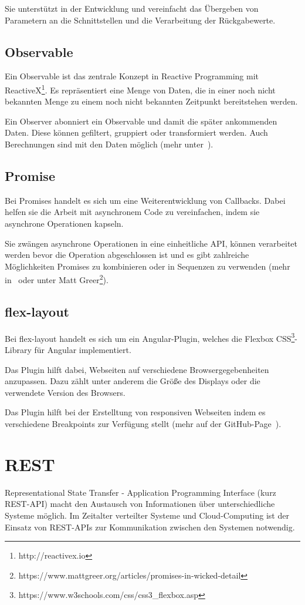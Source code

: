 Sie unterstützt in der Entwicklung und vereinfacht das Übergeben von Parametern an die Schnittstellen und die
Verarbeitung der Rückgabewerte.

\subsection{Observable}
Ein Observable ist das zentrale Konzept in Reactive Programming mit ReactiveX\footnote{http://reactivex.io}. Es
repräsentiert eine Menge von Daten, die in einer noch nicht bekannten Menge zu einem noch nicht bekannten Zeitpunkt
bereitstehen werden.

Ein Observer abonniert ein Observable und damit die später ankommenden Daten. Diese können gefiltert, gruppiert oder
transformiert werden. Auch Berechnungen sind mit den Daten möglich (mehr unter~\cite{book_grundlagen_observable}).

\subsection{Promise}
Bei Promises handelt es sich um eine Weiterentwicklung von Callbacks. Dabei helfen sie die Arbeit mit asynchronem Code
zu vereinfachen, indem sie asynchrone Operationen kapseln.

Sie zwängen asynchrone Operationen in eine einheitliche API, können verarbeitet werden bevor die Operation abgeschlossen
ist und es gibt zahlreiche Möglichkeiten Promises zu kombinieren oder in Sequenzen zu verwenden (mehr
in~\cite{book_grundlagen_promises} oder unter Matt Greer\footnote{https://www.mattgreer.org/articles/promises-in-wicked-detail}).

\subsection{flex-layout}
Bei flex-layout handelt es sich um ein Angular-Plugin, welches die Flexbox
CSS\footnote{https://www.w3schools.com/css/css3\_flexbox.asp}-Library für Angular implementiert.

Das Plugin hilft dabei, Webseiten auf verschiedene Browsergegebenheiten anzupassen. Dazu zählt unter anderem die Größe
des Displays oder die verwendete Version des Browsers.

Das Plugin hilft bei der Erstelltung von responsiven Webseiten indem es verschiedene Breakpoints zur Verfügung stellt
(mehr auf der GitHub-Page~\cite{online_grundlagen_flexlayout}).

\section{REST}
Representational State Transfer - Application Programming Interface (kurz REST-API) macht den Austausch von Informationen
über unterschiedliche Systeme möglich. Im Zeitalter verteilter Systeme und Cloud-Computing ist der Einsatz von REST-APIs
zur Kommunikation zwischen den Systemen notwendig.

